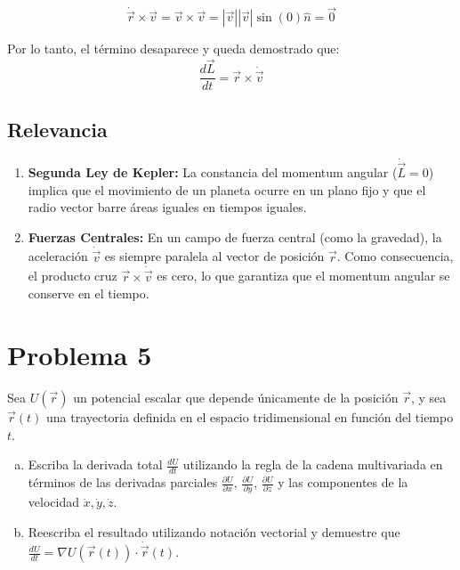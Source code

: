 \documentclass[12pt, letterpaper]{article}
\begin{document}
$$ \dot{\vec{r}} \times \vec{v} = \vec{v} \times \vec{v} = |\vec{v}| |\vec{v}| \sin(0) \hat{n} = \vec{0} $$

Por lo tanto, el término desaparece y queda demostrado que:
$$ \frac{d\vec{L}}{dt} = \vec{r} \times \dot{\vec{v}} $$

\subsection{Relevancia}

\begin{enumerate}
    \item \textbf{Segunda Ley de Kepler:} La constancia del momentum angular ($\dot{\vec{L}} = 0$) implica que el movimiento de un planeta ocurre en un plano fijo y que el radio vector barre áreas iguales en tiempos iguales.
    \item \textbf{Fuerzas Centrales:} En un campo de fuerza central (como la gravedad), la aceleración $\dot{\vec{v}}$ es siempre paralela al vector de posición $\vec{r}$. Como consecuencia, el producto cruz $\vec{r} \times \dot{\vec{v}}$ es cero, lo que garantiza que el momentum angular se conserve en el tiempo.
\end{enumerate}



\section{Problema 5}

Sea $U(\vec{r})$ un potencial escalar que depende únicamente de la posición $\vec{r}$, y sea $\vec{r}(t)$ una trayectoria definida en el espacio tridimensional en función del tiempo $t$.

\begin{enumerate}[a)]
    \item Escriba la derivada total $\frac{dU}{dt}$ utilizando la regla de la cadena multivariada en términos de las derivadas parciales $\frac{\partial U}{\partial x}$, $\frac{\partial U}{\partial y}$, $\frac{\partial U}{\partial z}$ y las componentes de la velocidad $\dot{x}, \dot{y}, \dot{z}$.
    \item Reescriba el resultado utilizando notación vectorial y demuestre que $\frac{dU}{dt} = \nabla U(\vec{r}(t)) \cdot \dot{\vec{r}}(t)$.
\end{enumerate}
\end{document}

